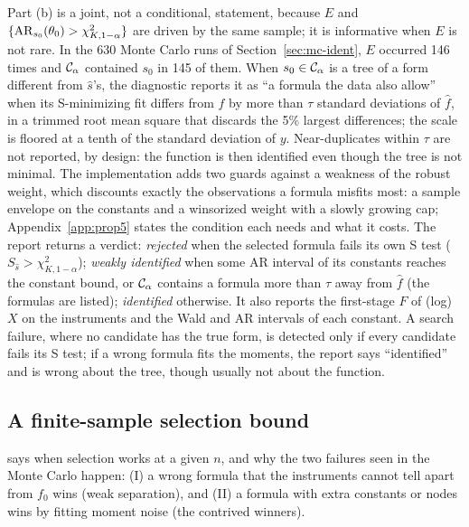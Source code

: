 Part (b) is a joint, not a conditional, statement, because $E$ and $\{\mathrm{AR}_{s_0}(\theta_0) > \chi^2_{K,1-\alpha}\}$ are driven by the same sample; it is informative when $E$ is not rare. In the 630 Monte Carlo runs of Section~\ref{sec:mc-ident}, $E$ occurred 146 times and $\mathcal{C}_\alpha$ contained $s_0$ in 145 of them. When $s_0 \in \mathcal{C}_\alpha$ is a tree of a form different from $\hat s$'s, the diagnostic reports it as ``a formula the data also allow'' when its S-minimizing fit differs from $\hat f$ by more than $\tau$ standard deviations of $\hat f$, in a trimmed root mean square that discards the 5\% largest differences; the scale is floored at a tenth of the standard deviation of $y$. Near-duplicates within $\tau$ are not reported, by design: the function is then identified even though the tree is not minimal. The implementation adds two guards against a weakness of the robust weight, which discounts exactly the observations a formula misfits most: a sample envelope on the constants and a winsorized weight with a slowly growing cap; Appendix~\ref{app:prop5} states the condition each needs and what it costs. The report returns a verdict: \emph{rejected} when the selected formula fails its own S test ($S_{\hat s} > \chi^2_{K,1-\alpha}$); \emph{weakly identified} when some AR interval of its constants reaches the constant bound, or $\mathcal{C}_\alpha$ contains a formula more than $\tau$ away from $\hat f$ (the formulas are listed); \emph{identified} otherwise. It also reports the first-stage $F$ of (log) $X$ on the instruments and the Wald and AR intervals of each constant. A search failure, where no candidate has the true form, is detected only if every candidate fails its S test; if a wrong formula fits the moments, the report says ``identified'' and is wrong about the tree, though usually not about the function.

\subsection{A finite-sample selection bound}
\label{sec:thm2}

 says when selection works at a given $n$, and why the two failures seen in the Monte Carlo happen: (I) a wrong formula that the instruments cannot tell apart from $f_0$ wins (weak separation), and (II) a formula with extra constants or nodes wins by fitting moment noise (the contrived winners).

